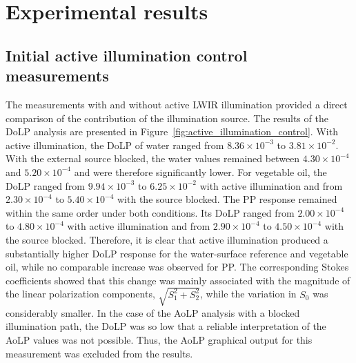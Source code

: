 \documentclass[pdflatex,sn-apa]{sn-jnl}
\begin{document}

\section{Experimental results}

\subsection{Initial active illumination control measurements}


The measurements with and without active LWIR illumination provided a direct comparison of the contribution of the illumination source. The results of the DoLP analysis are presented in Figure~\ref{fig:active_illumination_control}. With active illumination, the DoLP of water ranged from $8.36\times10^{-3}$ to $3.81\times10^{-2}$. With the external source blocked, the water values remained between $4.30\times10^{-4}$ and $5.20\times10^{-4}$ and were therefore significantly lower. For vegetable oil, the DoLP ranged from $9.94\times10^{-3}$ to $6.25\times10^{-2}$ with active illumination and from $2.30\times10^{-4}$ to $5.40\times10^{-4}$ with the source blocked. The PP response remained within the same order under both conditions. Its DoLP ranged from $2.00\times10^{-4}$ to $4.80\times10^{-4}$ with active illumination and from $2.90\times10^{-4}$ to $4.50\times10^{-4}$ with the source blocked. Therefore, it is clear that active illumination produced a substantially higher DoLP response for the water-surface reference and vegetable oil, while no comparable increase was observed for PP. The corresponding Stokes coefficients showed that this change was mainly associated with the magnitude of the linear polarization components, $\sqrt{S_1^2+S_2^2}$, while the variation in $S_0$ was considerably smaller. In the case of the AoLP analysis with a blocked illumination path, the DoLP was so low that a reliable interpretation of the AoLP values was not possible. Thus, the AoLP graphical output for this measurement was excluded from the results. 
\end{document}

